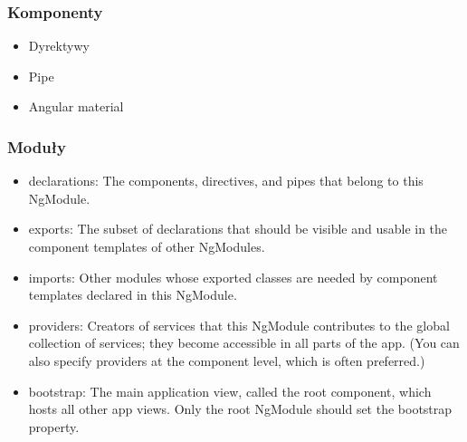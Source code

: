 \documentclass{beamer}
\begin{document}
\begin{frame}
    \frametitle{Komponenty}
    \begin{itemize}
	\item Dyrektywy
	\item Pipe
        \item Angular material
    \end{itemize}
\end{frame}

\begin{frame}
    \frametitle{Moduły}
    \begin{itemize}
        \item declarations: The components, directives, and pipes that belong to this NgModule.
        \item exports: The subset of declarations that should be visible and usable in the component templates of other NgModules.
        \item imports: Other modules whose exported classes are needed by component templates declared in this NgModule.
        \item providers: Creators of services that this NgModule contributes to the global collection of services; they become accessible in all parts of the app. (You can also specify providers at the component level, which is often preferred.)
        \item bootstrap: The main application view, called the root component, which hosts all other app views. Only the root NgModule should set the bootstrap property.
    \end{itemize}
\end{frame}
\end{document}
